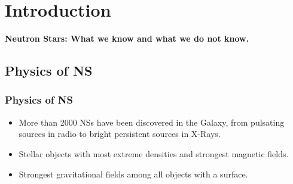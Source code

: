 \section{Introduction}

\begin{frame}
\begin{center} {\scriptsize
{\bf Neutron Stars: What we know and what we do not know.}}
\end{center}
\end{frame}



\subsection*{Physics of NS}

\begin{frame}
\frametitle{Physics of NS}  
	{\scriptsize 
	  \begin{itemize}
	   \item More than 2000 NSs have been discovered in the Galaxy, from pulsating sources in radio to bright persistent sources in X-Rays.
	   \item Stellar objects with most extreme densities and strongest magnetic fields.
	   \item Strongest gravitational fields among all objects with a surface.
	  \end{itemize}
	}       
\end{frame}


